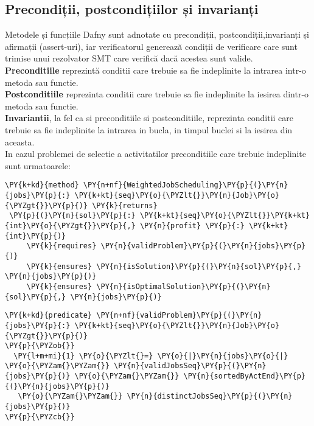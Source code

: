 \subsection{Precondiții, postcondițiilor și invarianți}
Metodele și funcțiile Dafny sunt adnotate cu precondiții, postcondiții,invarianți și afirmații (assert-uri), iar verificatorul generează condiții de verificare care sunt trimise unui rezolvator SMT care verifică
dacă acestea sunt valide.\cite{DBLP:journals/jlap/BlazquezMS23}\\
\textbf{Preconditiile} reprezintă conditii care trebuie sa fie indeplinite la intrarea intr-o metoda sau functie. \\\textbf{Postconditiile} reprezinta conditii care trebuie sa fie indeplinite la iesirea dintr-o metoda sau functie.
\\\textbf{Invariantii}, la fel ca si preconditiile si postconditiile, reprezinta conditii care trebuie sa fie indeplinite la intrarea in bucla, in timpul buclei si la iesirea din aceasta. \\In cazul problemei de selectie a activitatilor preconditiile care trebuie indeplinite sunt urmatoarele:
\begin{Verbatim}[commandchars=\\\{\}, fontsize=\small]
\PY{k+kd}{method} \PY{n+nf}{WeightedJobScheduling}\PY{p}{(}\PY{n}{jobs}\PY{p}{:} \PY{k+kt}{seq}\PY{o}{\PYZlt{}}\PY{n}{Job}\PY{o}{\PYZgt{}}\PY{p}{)} \PY{k}{returns}
 \PY{p}{(}\PY{n}{sol}\PY{p}{:} \PY{k+kt}{seq}\PY{o}{\PYZlt{}}\PY{k+kt}{int}\PY{o}{\PYZgt{}}\PY{p}{,} \PY{n}{profit} \PY{p}{:} \PY{k+kt}{int}\PY{p}{)}
     \PY{k}{requires} \PY{n}{validProblem}\PY{p}{(}\PY{n}{jobs}\PY{p}{)}
     \PY{k}{ensures} \PY{n}{isSolution}\PY{p}{(}\PY{n}{sol}\PY{p}{,} \PY{n}{jobs}\PY{p}{)}
     \PY{k}{ensures} \PY{n}{isOptimalSolution}\PY{p}{(}\PY{n}{sol}\PY{p}{,} \PY{n}{jobs}\PY{p}{)}
\end{Verbatim}
\begin{Verbatim}[commandchars=\\\{\}, fontsize=\small]
 \PY{k+kd}{predicate} \PY{n+nf}{validProblem}\PY{p}{(}\PY{n}{jobs}\PY{p}{:} \PY{k+kt}{seq}\PY{o}{\PYZlt{}}\PY{n}{Job}\PY{o}{\PYZgt{}}\PY{p}{)}
\PY{p}{\PYZob{}}
  \PY{l+m+mi}{1} \PY{o}{\PYZlt{}=} \PY{o}{|}\PY{n}{jobs}\PY{o}{|} \PY{o}{\PYZam{}\PYZam{}} \PY{n}{validJobsSeq}\PY{p}{(}\PY{n}{jobs}\PY{p}{)} \PY{o}{\PYZam{}\PYZam{}} \PY{n}{sortedByActEnd}\PY{p}{(}\PY{n}{jobs}\PY{p}{)}
   \PY{o}{\PYZam{}\PYZam{}} \PY{n}{distinctJobsSeq}\PY{p}{(}\PY{n}{jobs}\PY{p}{)}
\PY{p}{\PYZcb{}}
\end{Verbatim}

